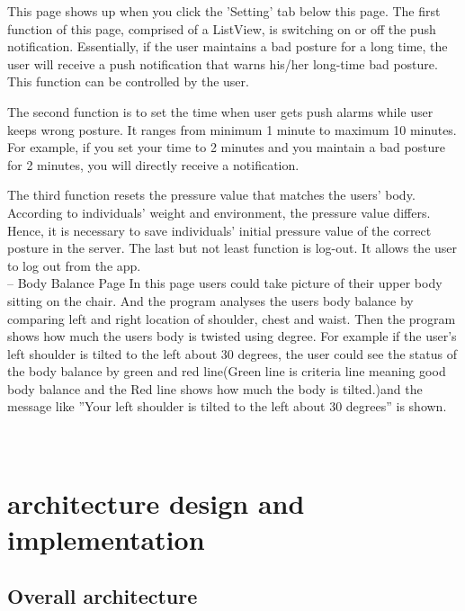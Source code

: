 \documentclass[conference]{IEEEtran}
\begin{document}
This page shows up when you click the 'Setting' tab below this page. The first function of this page, comprised of a ListView, is switching on or off the push notification. Essentially, if the user maintains a bad posture for a long time, the user will receive a push notification that warns his/her long-time bad posture. This function can be controlled by the user. 

The second function is to set the time when user gets push alarms while user keeps wrong posture. It ranges from minimum 1 minute to maximum 10 minutes. For example, if you set your time to 2 minutes and you maintain a bad posture for 2 minutes, you will directly receive a notification.

The third function resets the pressure value that matches the users' body. According to individuals' weight and environment, the pressure value differs. Hence, it is necessary to save individuals' initial pressure value of the  correct posture in the server. The last but not least function is log-out. It allows the user to log out from the app.\\

 -- Body Balance Page 
 In this page users could take picture of their upper body sitting on the chair. And the program analyses the users body balance by comparing left and right location of shoulder, chest and waist. Then the program shows how much the users body is twisted using degree. For example if the user's left shoulder is tilted to the left about 30 degrees, the user could see the status of the body balance by green and red line(Green line is criteria line meaning good body balance and the Red line shows how much the body is tilted.)and the message like ''Your left shoulder is tilted to the left about 30 degrees'' is shown. 
\\\\\\

\section{architecture design and implementation\\}

\subsection{Overall architecture}
\end{document}
